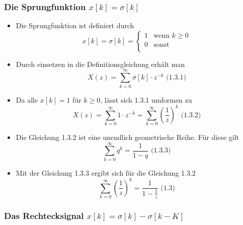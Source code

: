 \documentclass[11pt]{article}
\providecommand{\tightlist}{%
      \setlength{\itemsep}{0pt}\setlength{\parskip}{0pt}}
\begin{document}
    \subsubsection{\texorpdfstring{Die Sprungfunktion
\(x[k] = \sigma[k]\)}{Die Sprungfunktion x{[}k{]} = \textbackslash{}sigma{[}k{]}}}\label{die-sprungfunktion-xk-sigmak}

\begin{itemize}
\tightlist
\item
  Die Sprungfunktion ist definiert durch \[
  \displaystyle x[k] = \sigma[k] = \begin{cases}
   1 & \text{wenn $k \geq 0$} \\ 
   0 & \text{sonst} \\ 
   \end{cases}
  \]
\end{itemize}

    \begin{itemize}
\tightlist
\item
  Durch einsetzen in die Definitionsgleichung erhält man
  \[X(z) = \sum_{k=0}^\infty \sigma[k] \cdot z^{-k}\textrm{  (1.3.1)}\]
\end{itemize}

    \begin{itemize}
\tightlist
\item
  Da alle \(x[k] = 1\) für \(k \geq 0\), lässt sich 1.3.1 umformen zu
  \[X(z) = \sum_{k=0}^\infty 1 \cdot z^{-k} = \sum_{k=0}^\infty (\frac{1}{z})^k \textrm{  (1.3.2)}\]
\end{itemize}

    \begin{itemize}
\tightlist
\item
  Die Gleichung 1.3.2 ist eine unendlich geometrische Reihe. Für diese
  gilt \[\sum_{k=0}^\infty q^k = \frac{1}{1-q} \textrm{  (1.3.3)}\]
\end{itemize}

    \begin{itemize}
\tightlist
\item
  Mit der Gleichung 1.3.3 ergibt sich für die Gleichung 1.3.2
  \[\sum_{k=0}^\infty (\frac{1}{z})^k = \frac{1}{1-\frac{1}{z}} \textrm{  (1.3)}\]
\end{itemize}

    \subsubsection{\texorpdfstring{Das Rechtecksignal
\(x[k] = \sigma[k] - \sigma[k-K]\)}{Das Rechtecksignal x{[}k{]} = \textbackslash{}sigma{[}k{]} - \textbackslash{}sigma{[}k-K{]}}}\label{das-rechtecksignal-xk-sigmak---sigmak-k}
\end{document}
